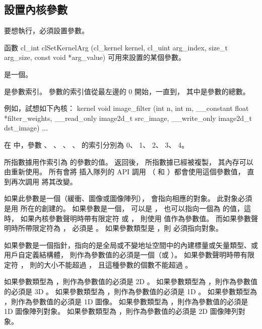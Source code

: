 \subsection{設置內核參數}

要想執行，必須設置參數。

函數
\startclc
cl_int clSetKernelArg (cl_kernel kernel,
			cl_uint arg_index,
			size_t arg_size,
			const void *arg_value)
\stopclc
可用來設置的某個參數。

 是一個。

 是參數索引。
參數的索引值從最左邊的 0 開始，一直到，
其中是參數的總數。

例如，試想如下內核：
\startclc
kernel void
image_filter (int n, int m,
		__constant float *filter_weights,
		__read_only image2d_t src_image,
		__write_only image2d_t dst_image)
{
	...
}
\stopclc

在  中，參數 、 、 、
 、  的索引分別為 0、 1、 2、 3、 4。

 所指數據用作索引為  的參數的值。
 返回後，  所指數據已經被複製，
其內存可以由重新使用。
所有會將  插入隊列的 API 調用
（  和 ）都會使用這個參數值，
直到再次調用  將其改變。

如果此參數是一個（緩衝、圖像或圖像陣列），
  會指向相應的對象。
此對象必須是用  所在的創建的。
如果參數是一個，  可以是 ，
也可以指向一個為  的值，這時，
如果內核參數聲明時帶有限定符  或 ，
則使用  值作為參數值。
而如果參數聲明時所帶限定符為 ，  必須是 。
如果參數類型是 ，則  必須指向對象。

如果參數是一個指針，指向的是全局或不變地址空間中的內建標量或矢量類型、或用戶自定義結構體，
則作為參數值的必須是一個（或 ）。
如果參數聲明時帶有限定符 ，
則的大小不能超過 ，
且這種參數的個數不能超過 。

如果參數類型為 ，則作為參數值的必須是 2D 。
如果參數類型為 ，則作為參數值的必須是 3D 。
如果參數類型為 ，則作為參數值的必須是 1D 。
如果參數類型為 ，則作為參數值的必須是 1D 圖像。
如果參數類型為 ，則作為參數值的必須是 1D 圖像陣列對象。
如果參數類型為 ，則作為參數值的必須是 2D 圖像陣列對象。

